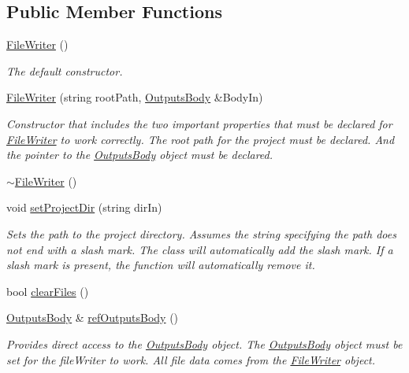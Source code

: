 \subsection*{Public Member Functions}
\begin{DoxyCompactItemize}
\item 
\hypertarget{class_file_writer_aa6b362f5b306dd3409af81a463e97f40}{\hyperlink{class_file_writer_aa6b362f5b306dd3409af81a463e97f40}{File\-Writer} ()}\label{class_file_writer_aa6b362f5b306dd3409af81a463e97f40}

\begin{DoxyCompactList}\small\item\em The default constructor. \end{DoxyCompactList}\item 
\hyperlink{class_file_writer_a08b98dceafbf0cd0875197072dfd7d58}{File\-Writer} (string root\-Path, \hyperlink{class_outputs_body}{Outputs\-Body} \&Body\-In)
\begin{DoxyCompactList}\small\item\em Constructor that includes the two important properties that must be declared for \hyperlink{class_file_writer}{File\-Writer} to work correctly. The root path for the project must be declared. And the pointer to the \hyperlink{class_outputs_body}{Outputs\-Body} object must be declared. \end{DoxyCompactList}\item 
\hyperlink{class_file_writer_ae5490307dcaf9237f4c1b8b8df433e03}{$\sim$\-File\-Writer} ()
\item 
void \hyperlink{class_file_writer_a15370335402192f7e5342a6049f664fc}{set\-Project\-Dir} (string dir\-In)
\begin{DoxyCompactList}\small\item\em Sets the path to the project directory. Assumes the string specifying the path does not end with a slash mark. The class will automatically add the slash mark. If a slash mark is present, the function will automatically remove it. \end{DoxyCompactList}\item 
bool \hyperlink{class_file_writer_a74a40c3c47b4d12582a2aa44c38d9d07}{clear\-Files} ()
\item 
\hyperlink{class_outputs_body}{Outputs\-Body} \& \hyperlink{class_file_writer_a77da1b41e1332209f39243fcca4d1287}{ref\-Outputs\-Body} ()
\begin{DoxyCompactList}\small\item\em Provides direct access to the \hyperlink{class_outputs_body}{Outputs\-Body} object. The \hyperlink{class_outputs_body}{Outputs\-Body} object must be set for the file\-Writer to work. All file data comes from the \hyperlink{class_file_writer}{File\-Writer} object. \end{DoxyCompactList}\item 

\end{DoxyCompactItemize}
